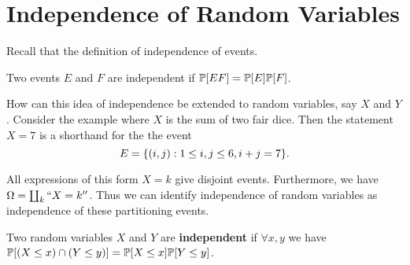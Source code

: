 \documentclass{subfiles}
\begin{document}
\section{Independence of Random Variables}

Recall that the definition of independence of events.
\begin{definition}
    Two events $E$ and $F$ are independent if $\mathbb{P}\qty[EF] = \mathbb{P}\qty[E] \mathbb{P}\qty[F]$.
\end{definition}

How can this idea of independence be extended to random variables, say $X$ and $Y$. Consider the example where $X$ is the sum of two fair dice. Then the statement $X = 7$ is a shorthand for the the event
\[
    E = \qty{(i,j) : 1 \leq i, j \leq 6, i + j = 7}
.\]

All expressions of this form $X = k$ give disjoint events. Furthermore, we have $\Omega = \coprod_k ``X = k''$. Thus we can identify independence of random variables as independence of these partitioning events.

\begin{definition}
    Two random variables $X$ and $Y$ are \textbf{independent} if $\forall x,y$ we have $\mathbb{P}\qty[(X \leq x) \cap (Y \leq y)] = \mathbb{P}\qty[X \leq x] \mathbb{P}\qty[Y \leq y]$.
\end{definition}
\end{document}
